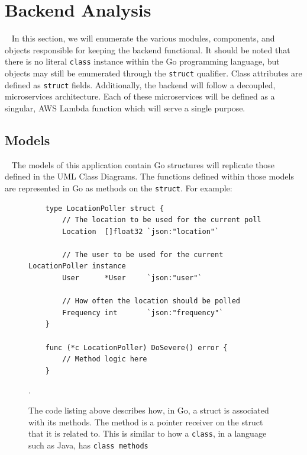 \documentclass[10pt, a4paper]{article}
\begin{document}
\section{Backend Analysis}
\par ~ In this section, we will enumerate the various modules, components, and objects responsible for keeping the backend functional. It should be noted that there is no literal \texttt{class} instance within the Go programming language, but objects may still be enumerated through the \texttt{struct} qualifier. Class attributes are defined as \texttt{struct} fields. Additionally, the backend will follow a decoupled, microservices architecture. Each of these microservices will be defined as a singular, AWS Lambda function which will serve a single purpose.

\subsection{Models}
\par ~ The models of this application contain Go structures will replicate those defined in the UML Class Diagrams. The functions defined within those models are represented in Go as methods on the \texttt{struct}. For example:


\begin{figure}[!h]
	\begin{center}
	\begin{lstlisting}
	type LocationPoller struct {
		// The location to be used for the current poll
		Location  []float32 `json:"location"`
		
		// The user to be used for the current LocationPoller instance
		User      *User     `json:"user"`
		
		// How often the location should be polled	
		Frequency int       `json:"frequency"`
	}

	func (*c LocationPoller) DoSevere() error {
		// Method logic here	
	}
	\end{lstlisting}
	\end{center}
\caption{The code listing above describes how, in Go, a struct is associated with its methods. The method is a pointer receiver on the struct that it is related to. This is similar to how a \texttt{class}, in a language such as Java, has \texttt{class methods}}.
\end{figure}
\end{document}
